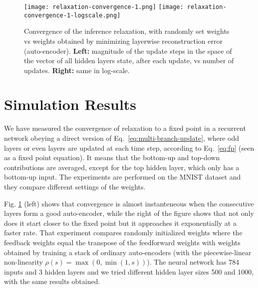 \documentclass{article}
\begin{document}

\begin{figure}[htpb]
  \begin{center}
    \hspace*{-1cm}\texttt{[image: relaxation-convergence-1.png]} \hspace*{-1cm}
    \texttt{[image: relaxation-convergence-1-logscale.png]}
  \end{center}
    \hspace*{-3cm}\begin{minipage}{1.4\textwidth}
  \caption{Convergence of the inference relaxation, with randomly set weights vs weights obtained
    by minimizing layerwise reconstruction error (auto-encoder). {\bf Left:} magnitude of the update steps in the
    space of the vector of all hidden layers state, after each update, vs number of updates. {\bf Right:} same in log-scale.}
  \label{fig:convergence-1}
    \end{minipage}
\end{figure}

\section{Simulation Results}

We have measured the convergence of relaxation to a fixed point in a recurrent network obeying a direct
version of Eq.~\ref{eq:multi-branch-update}, where odd layers or even layers are updated at each time step,
according to Eq.~\ref{eq:fp} (seen as a fixed point equation). It means that the bottom-up and top-down
contributions are averaged, except for the top hidden layer, which only has a bottom-up input.
The experiments are performed on the MNIST dataset and they compare different settings of the
weights.

Fig. \ref{fig:convergence-1} (left) shows that convergence is almost instanteneous when the consecutive layers form a
good auto-encoder, while the right of the figure shows that not only does it start closer to the fixed point but
it approaches it exponentially at a faster rate. That experiment compares randomly initialized weights
where the feedback weights equal the transpose of the feedforward weights with weights obtained by training
a stack of ordinary auto-encoders (with the piecewise-linear non-linearity $\rho(s)=\max(0,\min(1,s))$).
The neural network has 784 inputs and 3 hidden layers and we tried different hidden layer sizes 500 and 1000, with the
same results obtained.
\end{document}
